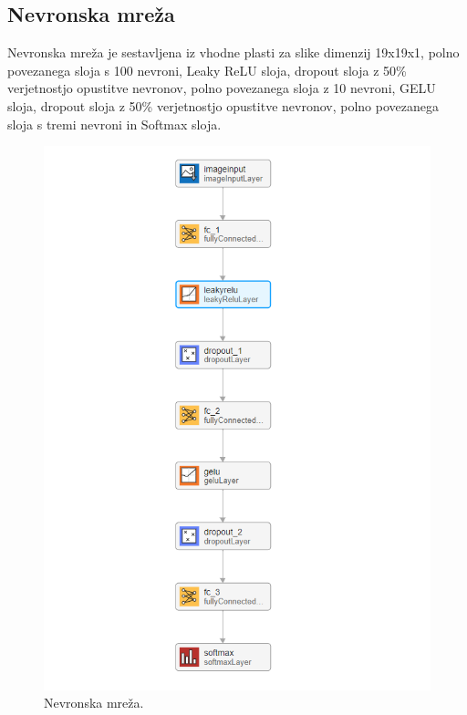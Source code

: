 \subsection{Nevronska mreža}
Nevronska mreža je sestavljena iz vhodne plasti za slike dimenzij 19x19x1, polno povezanega sloja s 100 nevroni, Leaky ReLU sloja, dropout sloja z 50\% verjetnostjo opustitve nevronov, polno povezanega sloja z 10 nevroni, GELU sloja, dropout sloja z 50\% verjetnostjo opustitve nevronov, polno povezanega sloja s tremi nevroni in Softmax sloja. 
\begin{figure}[h!]
\begin{center}
\includegraphics[width=0.5\linewidth]{slike/Neural network.png}
\end{center}
\caption{Nevronska mreža.}
\end{figure}






